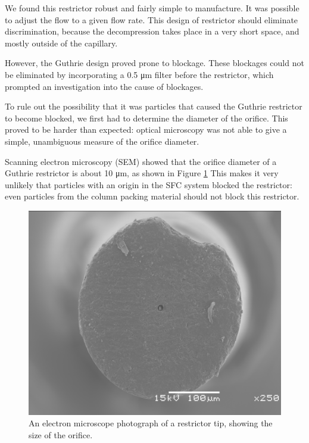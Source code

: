 We found this restrictor robust and fairly simple to manufacture. It was
possible to adjust the flow to a given flow rate. This design of restrictor
should eliminate discrimination, because the decompression takes place in a very
short space, and mostly outside of the capillary.

However, the Guthrie design proved prone to blockage. These blockages could not
be eliminated by incorporating a 0.5 \si{\micro\metre} filter before the restrictor, which
prompted an investigation into the cause of blockages.

To rule out the possibility that it was particles that caused the Guthrie
restrictor to become blocked, we first had to determine the diameter of the
orifice. This proved to be harder than expected: optical microscopy was not able
to give a simple, unambiguous measure of the orifice diameter.

Scanning electron microscopy (SEM) showed that the orifice diameter of a Guthrie
restrictor is about 10 \si{\micro\meter}, as shown in Figure
\ref{fig:restrictororifice} This makes it very unlikely that particles with an
origin in the SFC system blocked the restrictor: even particles from the column
packing material should not block this restrictor.

\begin{figure}
\centering
\includegraphics[width=\textwidth]{Figures/sem_h_001.png}
\decoRule

\caption[A electron microscope photo of a restrictor orifice]{An electron
microscope photograph of a restrictor tip, showing the size of the orifice.}

\label{fig:restrictororifice}
\end{figure}

